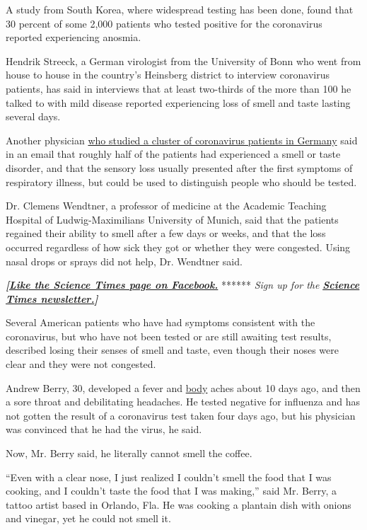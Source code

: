 A study from South Korea, where widespread testing has been done, found
that 30 percent of some 2,000 patients who tested positive for the
coronavirus reported experiencing anosmia.

Hendrik Streeck, a German virologist from the University of Bonn who
went from house to house in the country's Heinsberg district to
interview coronavirus patients, has said in interviews that at least
two-thirds of the more than 100 he talked to with mild disease reported
experiencing loss of smell and taste lasting several days.

Another physician
\href{https://www.medrxiv.org/content/10.1101/2020.03.05.20030502v1.full.pdf}{who
studied a cluster of coronavirus patients in Germany} said in an email
that roughly half of the patients had experienced a smell or taste
disorder, and that the sensory loss usually presented after the first
symptoms of respiratory illness, but could be used to distinguish people
who should be tested.

Dr. Clemens Wendtner, a professor of medicine at the Academic Teaching
Hospital of Ludwig-Maximilians University of Munich, said that the
patients regained their ability to smell after a few days or weeks, and
that the loss occurred regardless of how sick they got or whether they
were congested. Using nasal drops or sprays did not help, Dr. Wendtner
said.

\textbf{\emph{{[}}\href{http://on.fb.me/1paTQ1h}{\emph{Like the Science
Times page on Facebook.}}} ****** \emph{\textbar{} Sign up for the}
\textbf{\href{http://nyti.ms/1MbHaRU}{\emph{Science Times
newsletter.}}\emph{{]}}}

Several American patients who have had symptoms consistent with the
coronavirus, but who have not been tested or are still awaiting test
results, described losing their senses of smell and taste, even though
their noses were clear and they were not congested.

Andrew Berry, 30, developed a fever and
\href{https://www.nytimes3xbfgragh.onion/article/coronavirus-body-symptoms.html}{body}
aches about 10 days ago, and then a sore throat and debilitating
headaches. He tested negative for influenza and has not gotten the
result of a coronavirus test taken four days ago, but his physician was
convinced that he had the virus, he said.

Now, Mr. Berry said, he literally cannot smell the coffee.

``Even with a clear nose, I just realized I couldn't smell the food that
I was cooking, and I couldn't taste the food that I was making,'' said
Mr. Berry, a tattoo artist based in Orlando, Fla. He was cooking a
plantain dish with onions and vinegar, yet he could not smell it.

